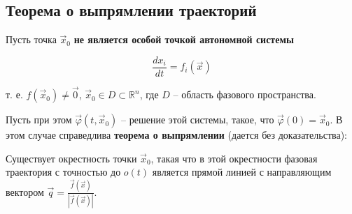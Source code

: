 \subsection{Теорема о выпрямлении траекторий}

Пусть точка $\vec x_0$ \textbf{не является особой точкой автономной системы} 

\begin{equation}
  \frac{d x_i}{d t} = f_i(\vec x)
\end{equation}

т. е. $f(\vec x_0) \neq \vec 0$, $\vec x_0 \in D \subset \mathbb{R}^n$, где $D$ -- область фазового пространства. 

Пусть при этом $\vec \varphi(t, \vec x_0)$ -- решение этой системы, такое, что $\vec \varphi(0) = \vec x_0$. В этом случае справедлива \textbf{теорема о выпрямлении} (дается без доказательства):

\begin{theorem}
  Существует окрестность точки $\vec x_0$, такая что в этой окрестности фазовая траектория с точностью до $o(t)$ является прямой линией с направляющим вектором $\vec{q} = \frac{\vec{f}(\vec x)}{|\vec f(\vec x)|}$.
\end{theorem}